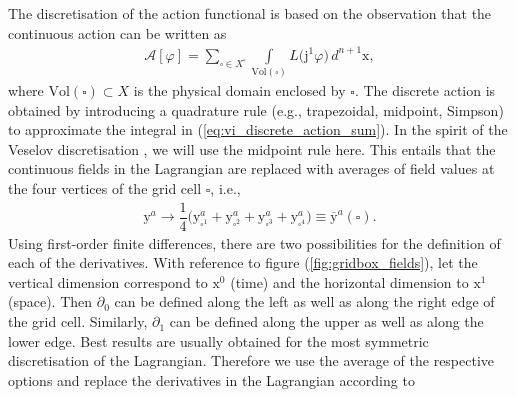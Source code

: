 \documentclass[12pt,a4paper,reqno]{article}
\begin{document}
The discretisation of the action functional is based on the observation that the continuous action can be written as
\begin{align}\label{eq:vi_discrete_action_sum}
\mathcal{A} [{\ensuremath{\varphi}}]
= \sum \limits_{\square \in X^{\square}} \int \limits_{\text{Vol}(\square)} L \big( {\ensuremath{\mathrm{j}}}^{1} {\ensuremath{\varphi}} \big) \, d^{n+1} {\ensuremath{{\ensuremath{\mathrm{{x}}}}}} ,
\end{align}
where $\text{Vol}(\square) \subset X$ is the physical domain enclosed by $\square$.
The discrete action is obtained by introducing a quadrature rule (e.g., trapezoidal, midpoint, Simpson) to approximate the integral in (\ref{eq:vi_discrete_action_sum}).
In the spirit of the Veselov discretisation \cite{Veselov:1988, Veselov:1991, MoserVeselov:1991, MarsdenPatrick:1998}, we will use the midpoint rule here. This entails that the continuous fields in the Lagrangian are replaced with averages of field values at the four vertices of the grid cell $\square$, i.e.,
\begin{align}\label{eq:vi_discrete_average}
{\ensuremath{{\ensuremath{\mathrm{{y}}}}}}^{a} \rightarrow \dfrac{1}{4} \Big( {\ensuremath{{\ensuremath{\mathrm{{y}}}}}}_{\square^1}^{a} + {\ensuremath{{\ensuremath{\mathrm{{y}}}}}}_{\square^2}^{a} + {\ensuremath{{\ensuremath{\mathrm{{y}}}}}}_{\square^3}^{a} + {\ensuremath{{\ensuremath{\mathrm{{y}}}}}}_{\square^4}^{a} \Big) \equiv \overline{\ensuremath{{\ensuremath{\mathrm{{y}}}}}}^{a} (\square).
\end{align}
Using first-order finite differences, there are two possibilities for the definition of each of the derivatives.
With reference to figure (\ref{fig:gridbox_fields}), let the vertical dimension correspond to ${\ensuremath{{\ensuremath{\mathrm{{x}}}}}}^{0}$ (time) and the horizontal dimension to ${\ensuremath{{\ensuremath{\mathrm{{x}}}}}}^{1}$ (space).
Then $\partial_{0}$ can be defined along the left as well as along the right edge of the grid cell.
Similarly, $\partial_{1}$ can be defined along the upper as well as along the lower edge. 
Best results are usually obtained for the most symmetric discretisation of the Lagrangian. Therefore we use the average of the respective options and replace the derivatives in the Lagrangian according to
\end{document}
